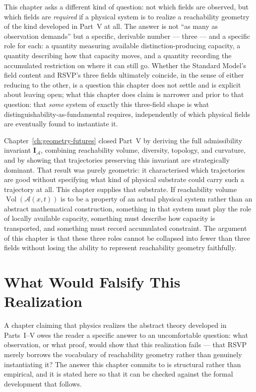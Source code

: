 \documentclass[12pt,twoside,openright]{book}
\newcommand{\adm}{\mathcal{A}}
\newcommand{\Vol}{\operatorname{Vol}}
\begin{document}
This chapter asks a different kind of question: not which
fields are observed, but which fields are \emph{required} if
a physical system is to realize a reachability geometry of
the kind developed in Part~V at all. The answer is not ``as
many as observation demands'' but a specific, derivable
number --- three --- and a specific role for each: a quantity
measuring available distinction-producing capacity, a
quantity describing how that capacity moves, and a quantity
recording the accumulated restriction on where it can still
go. Whether the Standard Model's field content and RSVP's
three fields ultimately coincide, in the sense of either
reducing to the other, is a question this chapter does not
settle and is explicit about leaving open; what this chapter
does claim is narrower and prior to that question: that
\emph{some} system of exactly this three-field shape is what
distinguishability-as-fundamental requires, independently of
which physical fields are eventually found to instantiate it.

Chapter~\ref{ch:geometry-futures} closed Part~V by deriving
the full admissibility invariant $\mathbf{I}_\adm$, combining
reachability volume, diversity, topology, and curvature, and
by showing that trajectories preserving this invariant are
strategically dominant. That result was purely geometric: it
characterised which trajectories are good without specifying
what kind of physical substrate could carry such a trajectory
at all. This chapter supplies that substrate. If reachability
volume $\Vol(\adm(x,t))$ is to be a property of an actual
physical system rather than an abstract mathematical
construction, something in that system must play the role of
locally available capacity, something must describe how
capacity is transported, and something must record
accumulated constraint. The argument of this chapter is that
these three roles cannot be collapsed into fewer than three
fields without losing the ability to represent reachability
geometry faithfully.

\section{What Would Falsify This Realization}
\label{sec:ch16-falsifiability}

A chapter claiming that physics realizes the abstract theory
developed in Parts~I--V owes the reader a specific answer to
an uncomfortable question: what observation, or what proof,
would show that this realization fails --- that RSVP merely
borrows the vocabulary of reachability geometry rather than
genuinely instantiating it? The answer this chapter commits
to is structural rather than empirical, and it is stated here
so that it can be checked against the formal development that
follows.
\end{document}
